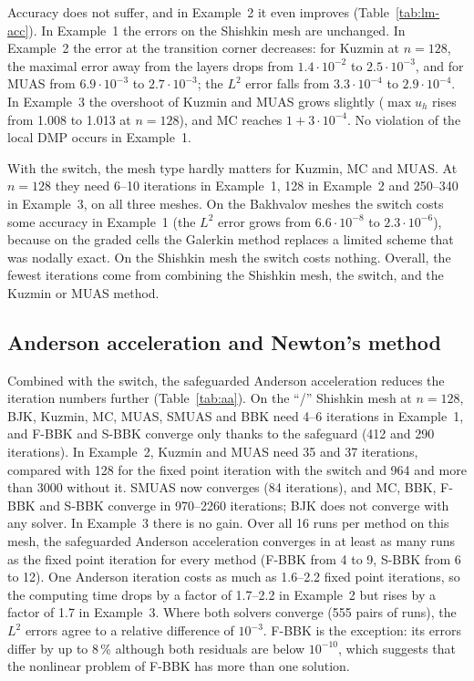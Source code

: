 \documentclass[11pt,a4paper]{article}
\theoremstyle{remark}
\begin{document}
Accuracy does not suffer, and in Example~2 it even improves (Table~\ref{tab:lm-acc}). In Example~1 the errors on the
Shishkin mesh are unchanged. In Example~2 the error at the transition corner decreases: for Kuzmin at $n=128$, the
maximal error away from the layers drops from $1.4\cdot10^{-2}$ to $2.5\cdot10^{-3}$, and for MUAS from
$6.9\cdot10^{-3}$ to $2.7\cdot10^{-3}$; the $L^2$ error falls from $3.3\cdot10^{-4}$ to $2.9\cdot10^{-4}$. In
Example~3 the overshoot of Kuzmin and MUAS grows slightly ($\max u_h$ rises from 1.008 to 1.013 at $n=128$), and MC
reaches $1+3\cdot10^{-4}$. No violation of the local DMP occurs in Example~1.

With the switch, the mesh type hardly matters for Kuzmin, MC and MUAS. At $n=128$ they need 6--10 iterations in
Example~1, 128 in Example~2 and 250--340 in Example~3, on all three meshes. On the Bakhvalov meshes the switch costs
some accuracy in Example~1 (the $L^2$ error grows from $6.6\cdot10^{-8}$ to $2.3\cdot10^{-6}$), because on the graded
cells the Galerkin method replaces a limited scheme that was nodally exact. On the Shishkin mesh the switch costs
nothing. Overall, the fewest iterations come from combining the Shishkin mesh, the switch, and the Kuzmin or MUAS
method.

\subsection{Anderson acceleration and Newton's method}



Combined with the switch, the safeguarded Anderson acceleration reduces the iteration numbers further
(Table~\ref{tab:aa}). On the ``/'' Shishkin mesh at $n=128$, BJK, Kuzmin, MC, MUAS, SMUAS and BBK need 4--6
iterations in Example~1, and F-BBK and S-BBK converge only thanks to the safeguard (412 and 290 iterations). In
Example~2, Kuzmin and MUAS need 35 and 37 iterations, compared with 128 for the fixed point iteration with the switch
and 964 and more than 3000 without it. SMUAS now converges (84 iterations), and MC, BBK, F-BBK and S-BBK converge in
970--2260 iterations; BJK does not converge with any solver. In Example~3 there is no gain. Over all 16 runs per
method on this mesh, the safeguarded Anderson acceleration converges in at least as many runs as the fixed point
iteration for every method (F-BBK from 4 to 9, S-BBK from 6 to 12). One Anderson iteration costs as much as 1.6--2.2
fixed point iterations, so the computing time drops by a factor of 1.7--2.2 in Example~2 but rises by a factor of 1.7
in Example~3. Where both solvers converge (555 pairs of runs), the $L^2$ errors agree to a relative difference of
$10^{-3}$. F-BBK is the exception: its errors differ by up to 8\,\% although both residuals are below $10^{-10}$,
which suggests that the nonlinear problem of F-BBK has more than one solution.
\end{document}
